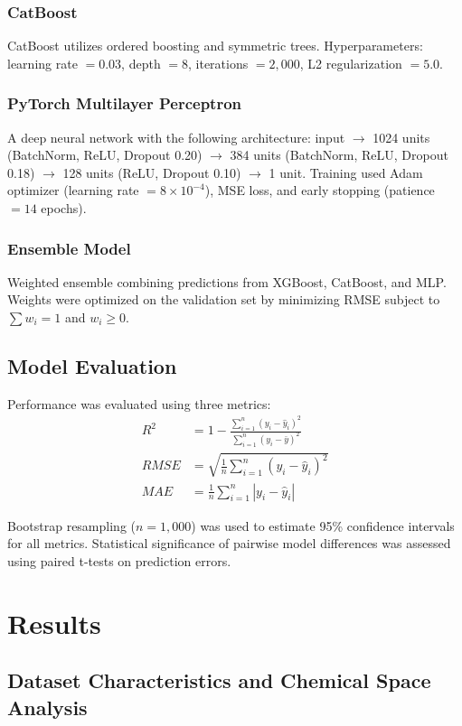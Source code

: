 \documentclass[12pt,a4paper]{article}
\begin{document}
\subsubsection{CatBoost}
CatBoost \citep{dorogush2018catboost} utilizes ordered boosting and symmetric trees. Hyperparameters: learning rate $= 0.03$, depth $= 8$, iterations $= 2,000$, L2 regularization $= 5.0$.

\subsubsection{PyTorch Multilayer Perceptron}
A deep neural network with the following architecture: input $\to$ 1024 units (BatchNorm, ReLU, Dropout 0.20) $\to$ 384 units (BatchNorm, ReLU, Dropout 0.18) $\to$ 128 units (ReLU, Dropout 0.10) $\to$ 1 unit. Training used Adam optimizer (learning rate $= 8 \times 10^{-4}$), MSE loss, and early stopping (patience $= 14$ epochs).

\subsubsection{Ensemble Model}
Weighted ensemble combining predictions from XGBoost, CatBoost, and MLP. Weights were optimized on the validation set by minimizing RMSE subject to $\sum w_i = 1$ and $w_i \geq 0$.

\subsection{Model Evaluation}

Performance was evaluated using three metrics:
\begin{align}
R^2 &= 1 - \frac{\sum_{i=1}^n (y_i - \hat{y}_i)^2}{\sum_{i=1}^n (y_i - \bar{y})^2} \\
RMSE &= \sqrt{\frac{1}{n}\sum_{i=1}^n (y_i - \hat{y}_i)^2} \\
MAE &= \frac{1}{n}\sum_{i=1}^n |y_i - \hat{y}_i|
\end{align}

Bootstrap resampling ($n=1,000$) was used to estimate 95\% confidence intervals for all metrics. Statistical significance of pairwise model differences was assessed using paired t-tests on prediction errors.

\section{Results}

\subsection{Dataset Characteristics and Chemical Space Analysis}
\end{document}
